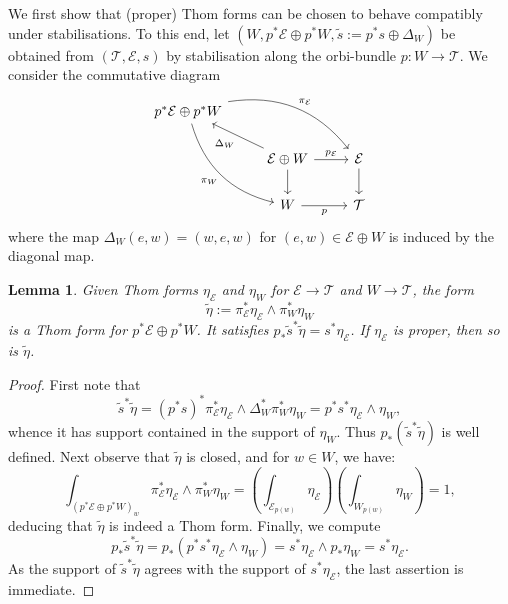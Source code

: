 \documentclass[11pt,psamsfonts, oneside, reqno]{amsart}
\newcommand{\cE}{\mathcal{E}}
\newcommand{\cT}{\mathcal{T}}
\newcommand{\wt}{\widetilde}
\newcommand{\obs}{s}
\newtheorem{lemma}[theorem]{Lemma}
\theoremstyle{definition}
\theoremstyle{remark}
\numberwithin{equation}{section}
\begin{document}
\noindent
We first show that (proper) Thom forms can be chosen to behave compatibly under stabilisations. To this end, let $(W, p^*\cE \oplus p^*W, \widetilde{s} :=p^*s \oplus \Delta_{W} )$ be obtained from $(\cT, \cE, s)$ by stabilisation along the orbi-bundle $p: W \rightarrow \cT$. We consider the commutative diagram
\begin{equation*}	
	\begin{tikzcd}
		p^*\cE \oplus p^*W \arrow[rrd,bend left,"\pi_{\cE}"]
		\arrow[ddr,bend right,swap,"\pi_{W}"]\\
		& \cE \oplus W \arrow[lu,"\Delta_W"] \arrow[d] \arrow[r,"p_{\cE}"] & \cE \arrow[d]  \\
		& W \arrow[r,swap,"p"]  & \cT
	\end{tikzcd}
\end{equation*}
where the map $\Delta_W(e,w) = (w,e,w)$ for $(e,w)\in \cE\oplus W$ is induced by the diagonal map.

\begin{lemma}
	\label{lem: from base to stabilisation}
	Given Thom forms $\eta_{\cE}$ and $\eta_{W}$ for $\cE \rightarrow \cT$ and $W \rightarrow \cT$, the form 
	$$\widetilde{\eta} := \pi_{\cE}^*\eta_{\cE} \wedge \pi_{W}^*\eta_W$$\noindent
	is a Thom form for $p^*\cE \oplus p^*W$. It satisfies $p_*\wt\obs^*\widetilde{\eta} = \obs^*\eta_\cE$. If $\eta_\cE$ is proper, then so is $\wt\eta$.
\end{lemma}

\begin{proof} First note that 
	$$\wt\obs^*\widetilde{\eta} = (p^*s)^* \pi_{\cE}^* \eta_{\cE} \wedge \Delta_W^* \pi_W^* \eta_W = p^*s^*\eta_\cE \wedge \eta_W,$$\noindent whence it has support contained in the support of $\eta_W$. Thus $p_*(\wt\obs^*\widetilde{\eta})$ is well defined. Next observe that $\widetilde{\eta}$ is closed, and for $w \in W$, we have: \begin{equation*}
		\int_{(p^*\cE \oplus p^*W)_w} \pi_{\cE}^*\eta_{\cE} \wedge \pi_{W}^*\eta_W = \left(\int_{\cE_{p(w)}} \eta_\cE\right)\left(\int_{W_{p(w)}} \eta_W\right) = 1,
	\end{equation*}
	deducing that $\widetilde{\eta}$ is indeed a Thom form. Finally, we compute 
	\begin{equation*}
		p_*\wt\obs^*\widetilde{\eta} = p_*(p^*s^*\eta_\cE \wedge \eta_W) = \obs^*\eta_{\cE} \wedge p_*\eta_W = \obs^*\eta_{\cE}.
	\end{equation*}
	As the support of $\wt\obs^*\wt\eta$ agrees with the support of $\obs^*\eta_\cE$, the last assertion is immediate.
\end{proof}
\end{document}
